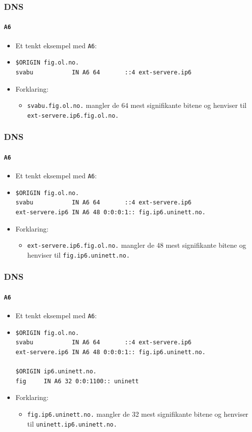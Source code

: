 \begin{frame}[fragile]%
  \frametitle{DNS}
  \framesubtitle{\texttt{A6}}
  \begin{itemize}%
  \item Et tenkt eksempel med \texttt{A6}:
  \item 
\begin{verbatim}
$ORIGIN fig.ol.no.
svabu           IN A6 64       ::4 ext-servere.ip6
\end{verbatim}
  \item Forklaring:
    \begin{itemize}%
    \item \texttt{svabu.fig.ol.no.} mangler de 64 mest signifikante bitene og henviser til \texttt{ext-servere.ip6.fig.ol.no.}
    \end{itemize}
  \end{itemize}
\end{frame}

\begin{frame}[fragile]%
  \frametitle{DNS}
  \framesubtitle{\texttt{A6}}
  \begin{itemize}%
  \item Et tenkt eksempel med \texttt{A6}:
  \item 
\begin{verbatim}
$ORIGIN fig.ol.no.
svabu           IN A6 64       ::4 ext-servere.ip6
ext-servere.ip6 IN A6 48 0:0:0:1:: fig.ip6.uninett.no.
\end{verbatim}
  \item Forklaring:
    \begin{itemize}%
    \item \texttt{ext-servere.ip6.fig.ol.no.} mangler de 48 mest signifikante bitene og henviser til \texttt{fig.ip6.uninett.no.}
    \end{itemize}
  \end{itemize}
\end{frame}

\begin{frame}[fragile]%
  \frametitle{DNS}
  \framesubtitle{\texttt{A6}}
  \begin{itemize}%
  \item Et tenkt eksempel med \texttt{A6}:
  \item 
\begin{verbatim}
$ORIGIN fig.ol.no.
svabu           IN A6 64       ::4 ext-servere.ip6
ext-servere.ip6 IN A6 48 0:0:0:1:: fig.ip6.uninett.no.

$ORIGIN ip6.uninett.no.
fig     IN A6 32 0:0:1100:: uninett
\end{verbatim}
  \item Forklaring:
    \begin{itemize}%
    \item \texttt{fig.ip6.uninett.no.} mangler de 32 mest signifikante bitene og henviser til \texttt{uninett.ip6.uninett.no.}
    \end{itemize}
  \end{itemize}
\end{frame}

